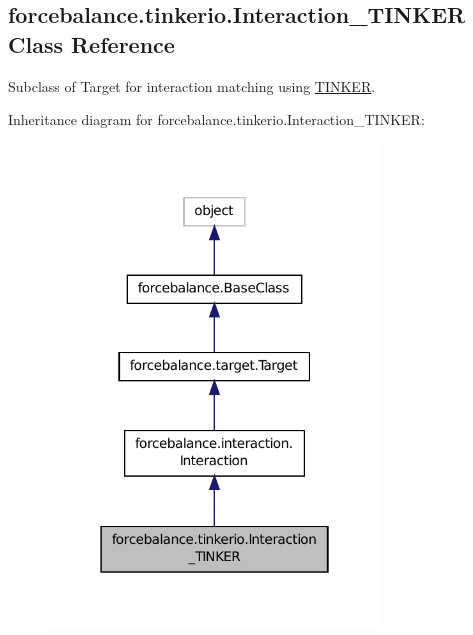 \hypertarget{classforcebalance_1_1tinkerio_1_1Interaction__TINKER}{\subsection{forcebalance.\-tinkerio.\-Interaction\-\_\-\-T\-I\-N\-K\-E\-R Class Reference}
\label{classforcebalance_1_1tinkerio_1_1Interaction__TINKER}
}


Subclass of Target for interaction matching using \hyperlink{classforcebalance_1_1tinkerio_1_1TINKER}{T\-I\-N\-K\-E\-R}.  




Inheritance diagram for forcebalance.\-tinkerio.\-Interaction\-\_\-\-T\-I\-N\-K\-E\-R\-:
\nopagebreak
\begin{figure}[H]
\begin{center}
\leavevmode
\includegraphics[width=250pt]{classforcebalance_1_1tinkerio_1_1Interaction__TINKER__inherit__graph}
\end{center}
\end{figure}


